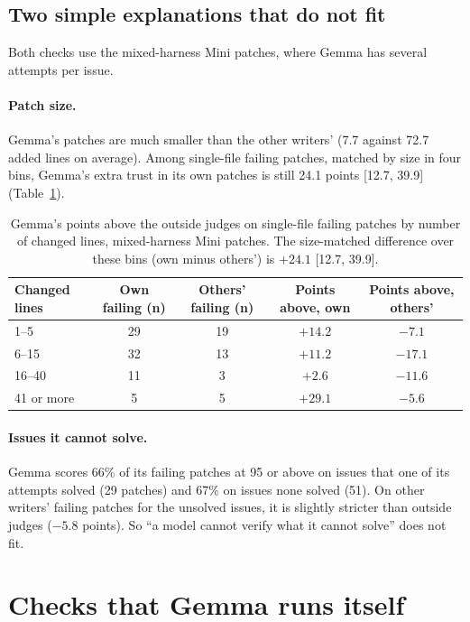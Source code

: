 \documentclass[10pt,letterpaper]{article}
\begin{document}
\subsection*{Two simple explanations that do not fit}

Both checks use the mixed-harness Mini patches, where Gemma has several attempts per issue.

\paragraph{Patch size.} Gemma's patches are much smaller than the other writers' (7.7 against 72.7 added lines on
average). Among single-file failing patches, matched by size in four bins, Gemma's extra trust in its own patches is still
24.1 points [12.7, 39.9] (Table~\ref{tab:size}).

\begin{table}[H]
\centering
\small
\caption{Gemma's points above the outside judges on single-file failing patches by number of changed lines, mixed-harness Mini patches. The
size-matched difference over these bins (own minus others') is $+24.1$ [12.7, 39.9].}
\label{tab:size}
\begin{tabular}{@{}lcccc@{}}
\toprule
Changed lines & Own failing (n) & Others' failing (n) & Points above, own & Points above, others' \\
\midrule
1--5 & 29 & 19 & $+14.2$ & $-7.1$ \\
6--15 & 32 & 13 & $+11.2$ & $-17.1$ \\
16--40 & 11 & 3 & $+2.6$ & $-11.6$ \\
41 or more & 5 & 5 & $+29.1$ & $-5.6$ \\
\bottomrule
\end{tabular}
\end{table}

\paragraph{Issues it cannot solve.} Gemma scores 66\% of its failing patches at 95 or above on issues that one of its
attempts solved (29 patches) and 67\% on issues none solved (51). On other writers' failing patches for the unsolved
issues, it is slightly stricter than outside judges ($-5.8$ points). So ``a model cannot verify what it cannot solve''
does not fit.

\section{Checks that Gemma runs itself}
\label{app:checks}
\end{document}
